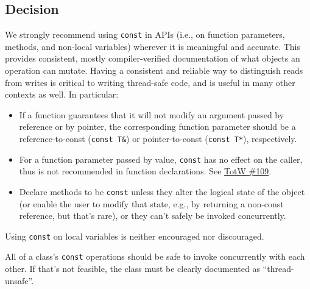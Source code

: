 \subsection{Decision}
We strongly recommend using \texttt{const} in APIs (i.e., on function parameters, methods, and non-local variables) wherever it is meaningful and accurate. This provides consistent, mostly compiler-verified documentation of what objects an operation can mutate. Having a consistent and reliable way to distinguish reads from writes is critical to writing thread-safe code, and is useful in many other contexts as well. In particular:
\begin{itemize}
    \item If a function guarantees that it will not modify an argument passed by reference or by pointer, the corresponding function parameter should be a reference-to-const (\texttt{const T&}) or pointer-to-const (\texttt{const T*}), respectively.
    \item For a function parameter passed by value, \texttt{const} has no effect on the caller, thus is not recommended in function declarations. See \hyperref[ch:tip-of-the-week-109]{TotW \#109}.
    \item Declare methods to be \texttt{const} unless they alter the logical state of the object (or enable the user to modify that state, e.g., by returning a non-const reference, but that's rare), or they can't safely be invoked concurrently.
\end{itemize}
Using \texttt{const} on local variables is neither encouraged nor discouraged.

All of a class's \texttt{const} operations should be safe to invoke concurrently with each other. If that's not feasible, the class must be clearly documented as \enquote{thread-unsafe}.

